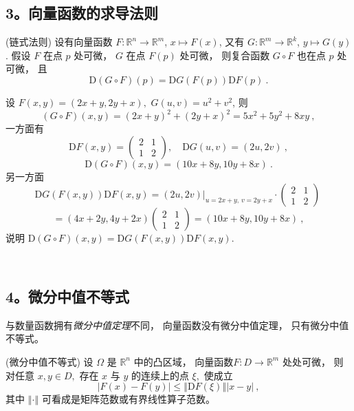 \subsection{3。向量函数的求导法则}
\begin{theorem}{(链式法则)}
设有向量函数 $F:\mathbb{R}^{n}\rightarrow\mathbb{R}^{m}$, $x\mapsto F(x)$,
又有 $G:\mathbb{R}^{m}\rightarrow\mathbb{R}^{k}$, $y\mapsto G(y)$.
假设 $F$ 在点 $p$ 处可微， $G$ 在点 $F(p)$ 处可微， 则复合函数 $G\circ F$ 也在点 $p$
处可微， 且
\[
\mathrm{D}(G\circ F)(p)=\mathrm{D}G(F(p))\mathrm{D}F(p)~.
\]
\end{theorem}

\begin{example}{}
设 $F(x,y)=(2x+y,2y+x),$ $G(u,v)=u^{2}+v^{2}$, 则
\[
(G\circ F)(x,y)=(2x+y)^{2}+(2y+x)^{2}=5x^{2}+5y^{2}+8xy~,
\]
一方面有 
$$
\mathrm{D}F(x,y)=\left(\begin{array}{cc}
2& 1\\
1 & 2
\end{array}\right),\quad\mathrm{D}G(u,v)=(2u,2v)~,
$$
\[
\mathrm{D}(G\circ F)(x,y)=(10x+8y,10y+8x)~.
\]
另一方面 
$$
\mathrm{D}G(F(x,y))\mathrm{D}F(x,y)  =  \left.(2u,2v)\right|_{u=2x+y,\,v=2y+x}\cdot\left(\begin{array}{cc}
2 & 1\\
1 & 2
\end{array}\right)~
$$
$$
  =  (4x+2y,4y+2x)\left(\begin{array}{cc}
2 & 1\\
1 & 2
\end{array}\right)
  =  (10x+8y,10y+8x)~,
$$
 说明 $\mathrm{D}(G\circ F)(x,y)=\mathrm{D}G(F(x,y))\mathrm{D}F(x,y)$. 
\end{example}
\verb| |

\subsection{4。微分中值不等式}
与数量函数拥有\textsl{微分中值定理}不同， 向量函数没有微分中值定理， 只有微分中值不等式。 

\begin{theorem}{(微分中值不等式)}
设 $\Omega$ 是 $\mathbb{R}^{n}$ 中的凸区域， 向量函数$F:D\rightarrow\mathbb{R}^{m}$
处处可微， 则对任意 $x,y\in D,$ 存在 $x$ 与 $y$ 的连续上的点 $\xi,$ 使成立
\[
|F(x)-F(y)|\leqslant\left\Vert \mathrm{D}F(\xi)\right\Vert |x-y|~,
\]
其中 $\left\Vert \cdot\right\Vert $ 可看成是矩阵范数或有界线性算子范数。 
\end{theorem}


